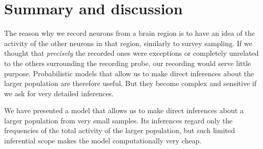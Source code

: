 \documentclass[\ifafour a4paper,12pt,\else a5paper,10pt,\fi%
onecolumn,oneside,article,%
british%
]{memoir}
\makeatletter
\theoremstyle{remark}
\theoremstyle{innote}
\def\sum{\DOTSI\sumop\slimits@}
\def\prod{\DOTSI\prodop\slimits@}
\newcommand*{\citep}{\footcites}
\newcommand*{\defd}{\coloneqq}
\newcommand*{\pf}{\mathrm{p}}%
\renewcommand*{\|}{\nonscript\,\vert\nonscript\;\mathopen{}}
\newcommand*{\yAv}{A}
\newcommand*{\yFF}{F}
\newcommand*{\yF}{\bm{\yFF}}
\newcommand*{\yA}{\yAv}%
\newcommand*{\yI}{\varIota}
\newcommand*{\re}{\Eta}
\newcommand*{\yL}{L}
\makeatother
\begin{document}



\section{Summary and discussion}
\label{sec:summary_discussion}

The reason why we record neurons from a brain region is to have an idea of
the activity of the other neurons in that region, similarly to survey
sampling. If we thought that \emph{precisely} the recorded ones were
exceptions or completely unrelated to the others surrounding the recording
probe, our recording would serve little purpose. Probabilistic models that
allow us to make direct inferences about the larger population are
therefore useful. But they become complex and sensitive if we ask for very
detailed inferences.

We have presented a model that allows us to make direct inferences about a
larger population from very small samples. Its inferences regard only the
frequencies of the total activity of the larger population, but such
limited inferential scope makes the model computationally very cheap.
\end{document}

